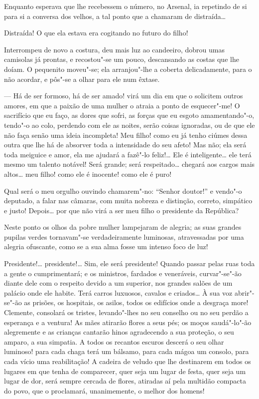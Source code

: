 Enquanto esperava que lhe recebessem o número, no Arsenal, ia repetindo
de si para si a conversa dos velhos, a tal ponto que a chamaram de
distraída\ldots{}

Distraída! O que ela estava era cogitando no futuro do filho!

Interrompeu de novo a costura, deu mais luz ao candeeiro, dobrou umas
camisolas já prontas, e recostou"-se um pouco, descansando as costas que
lhe doíam. O pequenito moveu"-se; ela arranjou"-lhe a coberta
delicadamente, para o não acordar, e pôs"-se a olhar para ele num êxtase.

--- Há de ser formoso, há de ser amado! virá um dia em que o solicitem
outros amores, em que a paixão de uma mulher o atraia a ponto de
esquecer"-me! O sacrifício que eu faço, as dores que sofri, as forças que
eu esgoto amamentando"-o, tendo"-o ao colo, perdendo com ele as noites,
serão coisas ignoradas, ou de que ele não faça senão uma ideia
incompleta! Meu filho! como eu já tenho ciúmes dessa outra que lhe há de
absorver toda a intensidade do seu afeto! Mas não; ela será toda
meiguice e amor, ela me ajudará a fazê"-lo feliz!\ldots{} Ele é inteligente\ldots{}
ele terá mesmo um talento notável! Será grande; será respeitado\ldots{}
chegará aos cargos mais altos\ldots{} meu filho! como ele é inocente! como
ele é puro!

Qual será o meu orgulho ouvindo chamarem"-no: ``Senhor doutor!'' e
vendo"-o deputado, a falar nas câmaras, com muita nobreza e distinção,
correto, simpático e justo! Depois\ldots{} por que não virá a ser meu filho o
presidente da República?

Neste ponto os olhos da pobre mulher lampejaram de alegria; as suas
grandes pupilas verdes tornavam"-se verdadeiramente luminosas,
atravessadas por uma alegria ofuscante, como se a sua alma fosse um
intenso foco de luz!

Presidente!\ldots{} presidente!\ldots{} Sim, ele será presidente! Quando passar
pelas ruas toda a gente o cumprimentará; e os ministros, fardados e
veneráveis, curvar"-se"-ão diante dele com o respeito devido a um
superior, nos grandes salões de um palácio onde ele habite. Terá carros
luxuosos, cavalos e criados\ldots{} À sua voz abrir"-se"-ão as prisões, os
hospitais, os asilos, todos os edifícios onde a desgraça more! Clemente,
consolará os tristes, levando"-lhes no seu conselho ou no seu perdão a
esperança e a ventura! As mães atirarão flores a seus pés; os moços
saudá"-lo"-ão alegremente e as crianças cantarão hinos agradecendo a sua
proteção, o seu amparo, a sua simpatia. A todos os recantos escuros
descerá o seu olhar luminoso! para cada chaga terá um bálsamo, para cada
mágoa um consolo, para cada vício uma reabilitação! A cadeira de veludo
que lhe destinarem em todos os lugares em que tenha de comparecer, quer
seja um lugar de festa, quer seja um lugar de dor, será sempre cercada
de flores, atiradas aí pela multidão compacta do povo, que o proclamará,
unanimemente, o melhor dos homens!

